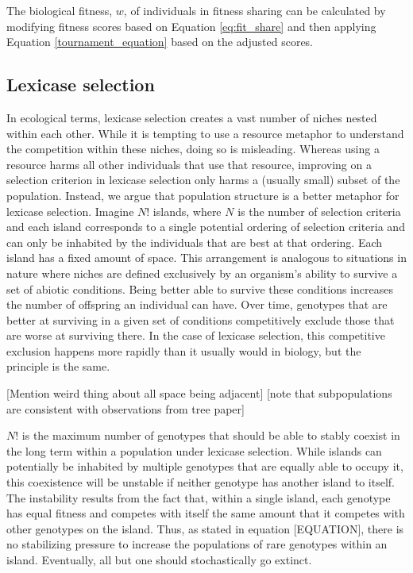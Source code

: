 The biological fitness, $w$, of individuals in fitness sharing can be calculated by modifying fitness scores based on Equation \ref{eq:fit_share} and then applying Equation \ref{tournament_equation} based on the adjusted scores.

\subsection{Lexicase selection}

In ecological terms, lexicase selection creates a vast number of niches nested within each other. While it is tempting to use a resource metaphor to understand the competition within these niches, doing so is misleading. Whereas using a resource harms all other individuals that use that resource, improving on a selection criterion in lexicase selection only harms a (usually small) subset of the population. Instead, we argue that population structure is a better metaphor for lexicase selection. Imagine $N!$ islands, where $N$ is the number of selection criteria and each island corresponds to a single potential ordering of selection criteria and can only be inhabited by the individuals that are best at that ordering. Each island has a fixed amount of space. This arrangement is analogous to situations in nature where niches are defined exclusively by an organism's ability to survive a set of abiotic conditions. Being better able to survive these conditions increases the number of offspring an individual can have. Over time, genotypes that are better at surviving in a given set of conditions competitively exclude those that are worse at surviving there. In the case of lexicase selection, this competitive exclusion happens more rapidly than it usually would in biology, but the principle is the same. 

[Mention weird thing about all space being adjacent]
[note that subpopulations are consistent with observations from tree paper]

$N!$ is the maximum number of genotypes that should be able to stably coexist in the long term within a population under lexicase selection. While islands can potentially be inhabited by multiple genotypes that are equally able to occupy it, this coexistence will be unstable if neither genotype has another island to itself. The instability results from the fact that, within a single island, each genotype has equal fitness and competes with itself the same amount that it competes with other genotypes on the island. Thus, as stated in equation [EQUATION], there is no stabilizing pressure to increase the populations of rare genotypes within an island. Eventually, all but one should stochastically go extinct.

